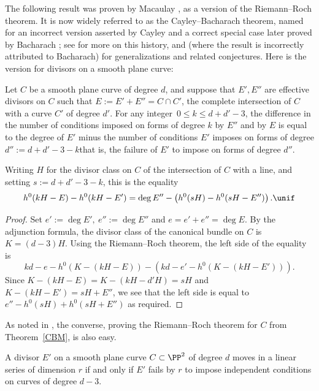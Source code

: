 The following result was proven by Macaulay \cite[p.~424]{Macaulay1900}, as a version of the Riemann--Roch theorem. It is now widely referred to as the Cayley--Bacharach theorem, named for an
%
%
incorrect version asserted by Cayley and a correct special case later proved by
Bacharach \cite{Bacharach1886}; see \cite[Section 2.3]{eisenbud-gray} for more on this history, and 
\cite{MR1376653} (where the result is incorrectly attributed to Bacharach) for generalizations and related conjectures. Here is the version for divisors on a smooth plane curve:

\begin{theorem}\label{CBM} Let $C$ be a smooth plane curve of degree $d$, and suppose that
$E', E''$ are effective divisors on $C$ such that $E:=E'+E'' = C\cap C'$, the complete intersection of $C$
with a curve $C'$ of degree $d'$. For any integer 
$\,0\leq k \leq d+d'-3$, the difference in the number of conditions imposed 
on forms of degree $k$ by $E''$ and by $E$ is equal to the degree of $E'$ minus the
number of conditions $E'$ imposes on forms of degree 
$d'':=d+d'-3 -k$\emdash that is, the failure of
$E'$ to impose 
%
on forms of degree $d''$.

 Writing $H$ for
the divisor class on $C$ of the intersection of $C$ with a line, and setting $s := d+d'-3-k$, this is the equality
$$
h^0(kH-E) - h^0(kH-E')  = \deg E'' - \left(h^0(sH) -  h^0(sH-E'')\right)
.
\unif
$$
\end{theorem}

\begin{proof}
Set $e' := \deg E', \ e'':= \deg E''$ and $e = e'+e'' = \deg E.$
By the adjunction formula, the divisor class of the canonical bundle
on $C$ is $K = (d-3)H$. Using the Riemann--Roch theorem, the left side
of the equality is 
$$
kd-e-h^0(K - (kH-E)) - \left(kd-e' - h^0(K-(kH-E'))\right).
$$
Since $K - (kH-E) = K - (kH-d'H) = sH$ and  $K-(kH-E') = sH+E''$, we see that the 
left side is equal to 
$
e'' - h^0(sH) +  h^0(sH+E'')
$
as required.
\unif
\end{proof}

As noted in \cite{eisenbud-gray}, the converse, proving the Riemann--Roch theorem for $C$ from Theorem~\ref{CBM}, is also easy.

\begin{corollary}\label{CBM cor 1}
A divisor $E'$ on a smooth plane curve $C\subset \PP^2$ of degree $d$ moves
in a linear series of dimension $r$ if and only if $E'$ fails by $r$ to impose
independent conditions on curves of degree $d-3$.
\unif
\end{corollary}

